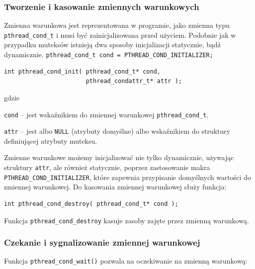 \subsubsection{Tworzenie i kasowanie zmiennych warunkowych}

Zmienna warunkowa jest reprezentowana w programie, jako zmienna typu \lstinline[style=MyCStyle]{pthread_cond_t} i musi być zainicjalizowana przed użyciem. Podobnie jak w przypadku muteksów istnieją dwa sposoby inicjalizacji statycznie, bądź dynamicznie.
\lstinline[style=MyCStyle]{pthread_cond_t cond = PTHREAD_COND_INITIALIZER;}

\begin{lstlisting}[style=MyCStyle]
int pthread_cond_init( pthread_cond_t* cond,
                       pthread_condattr_t* attr );
\end{lstlisting}

gdzie

\begin{myitemize}
\item \lstinline[style=MyCStyle]{cond} -- jest wskaźnikiem do zmiennej warunkowej \lstinline[style=MyCStyle]{pthread_cond_t}.
\item \lstinline[style=MyCStyle]{attr} -- jest albo \lstinline[style=MyCStyle]{NULL} (atrybuty domyślne) albo wskaźnikiem do struktury definiującej atrybuty muteksu.
\end{myitemize}


Zmienne warunkowe możemy inicjalizować nie tylko dynamicznie, używając struktury \lstinline[style=MyCStyle]{attr}, ale również  statycznie, poprzez zastosowanie makra \lstinline[style=MyCStyle]{PTHREAD_COND_INITIALIZER}, które zapewnia przypisanie domyślnych wartości do zmiennej warunkowej. Do kasowania zmiennej warunkowej służy funkcja:


\begin{lstlisting}[style=MyCStyle]
int pthread_cond_destroy( pthread_cond_t* cond );
\end{lstlisting}

Funkcja \lstinline[style=MyCStyle]{pthread_cond_destroy} kasuje zasoby zajęte przez zmienną warunkową.

\subsubsection{Czekanie i sygnalizowanie zmiennej warunkowej}

Funkcja \lstinline[style=MyCStyle]{pthread_cond_wait()} pozwala na oczekiwanie na zmienną warunkową:


